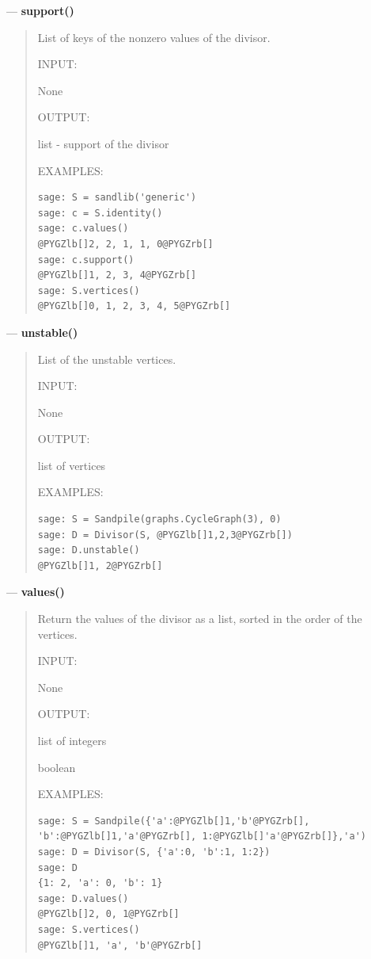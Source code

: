 \documentclass[letterpaper,10pt,english]{manual}
\begin{document}
---
\hypertarget{support-divisor}{}
\textbf{support()}
\begin{quote}

List of keys of the nonzero values of the divisor.

INPUT:

None

OUTPUT:

list - support of the divisor

EXAMPLES:

\begin{Verbatim}[commandchars=@\[\]]
sage: S = sandlib('generic')
sage: c = S.identity()
sage: c.values()
@PYGZlb[]2, 2, 1, 1, 0@PYGZrb[]
sage: c.support()
@PYGZlb[]1, 2, 3, 4@PYGZrb[]
sage: S.vertices()
@PYGZlb[]0, 1, 2, 3, 4, 5@PYGZrb[]
\end{Verbatim}
\end{quote}

---
\hypertarget{unstable-divisor}{}
\textbf{unstable()}
\begin{quote}

List of the unstable vertices.

INPUT:

None

OUTPUT:

list of vertices

EXAMPLES:

\begin{Verbatim}[commandchars=@\[\]]
sage: S = Sandpile(graphs.CycleGraph(3), 0)
sage: D = Divisor(S, @PYGZlb[]1,2,3@PYGZrb[])
sage: D.unstable()
@PYGZlb[]1, 2@PYGZrb[]
\end{Verbatim}
\end{quote}

---
\hypertarget{values-divisor}{}
\textbf{values()}
\begin{quote}

Return the values of the divisor as a list, sorted in the order of the
vertices.

INPUT:

None

OUTPUT:

list of integers

boolean

EXAMPLES:

\begin{Verbatim}[commandchars=@\[\]]
sage: S = Sandpile({'a':@PYGZlb[]1,'b'@PYGZrb[], 'b':@PYGZlb[]1,'a'@PYGZrb[], 1:@PYGZlb[]'a'@PYGZrb[]},'a')
sage: D = Divisor(S, {'a':0, 'b':1, 1:2})
sage: D
{1: 2, 'a': 0, 'b': 1}
sage: D.values()
@PYGZlb[]2, 0, 1@PYGZrb[]
sage: S.vertices()
@PYGZlb[]1, 'a', 'b'@PYGZrb[]
\end{Verbatim}
\end{quote}
\end{document}

